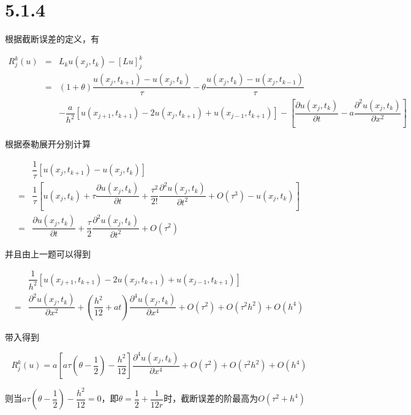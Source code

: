 \documentclass[9pt, a4paper]{article}
\begin{document}
\section*{5.1.4}
根据截断误差的定义，有
\begin{spacing}{2.3}
	\begin{equation}
	\begin{array}{rcl}
	R_j^k(u) & = & L_ku(x_j,t_k)-[Lu]_j^k\\
	& = & (1+\theta)\dfrac{u(x_j,t_{k+1})-u(x_j,t_k)}{\tau}-\theta \dfrac{u(x_j,t_k)-u(x_j,t_{k-1})}{\tau}\\
	&   & - \dfrac{a}{h^2}\left[u(x_{j+1},t_{k+1})-2u(x_j,t_{k+1})+u(x_{j-1},t_{k+1})\right]- \left[\dfrac{\partial u(x_j,t_k)}{\partial t}-a\dfrac{\partial^2 u(x_j,t_k)}{\partial x^2}\right]
	\end{array}
	\end{equation}
\end{spacing}
根据泰勒展开分别计算
\begin{spacing}{2.3}
	\begin{equation}
	\begin{array}{cl}
		& \dfrac{1}{\tau}[u(x_j,t_{k+1})-u(x_j,t_k)] \\
	  = & \dfrac{1}{\tau}[u(x_j,t_k)+\tau\dfrac{\partial u(x_j,t_k)}{\partial t}+\dfrac{\tau^2}{2!}\dfrac{\partial^2u(x_j,t_k)}{\partial t^2}+O(\tau^3)-u(x_j,t_k)]\\
	  = & \dfrac{\partial u(x_j,t_k)}{\partial t}+\dfrac{\tau}{2}\dfrac{\partial^2u(x_j,t_k)}{\partial t^2}+O(\tau^2)
	\end{array}
	\end{equation}
\end{spacing}
并且由上一题可以得到
\begin{spacing}{2.3}
	\begin{equation}
	\begin{array}{cl}
		 & \dfrac{1}{h^2}[u(x_{j+1},t_{k+1})-2u(x_j,t_{k+1})+u(x_{j-1},t_{k+1})]\\
		=& \dfrac{\partial^2u(x_j,t_k)}{\partial x^2}+\left(\dfrac{h^2}{12}+at\right)\dfrac{\partial^4u(x_j,t_k)}{\partial x^4}+O(\tau^2)+O(\tau^2h^2)+O(h^4)
	\end{array}
	\end{equation}
\end{spacing}
带入得到
\begin{spacing}{2.3}
	\begin{equation}
	R_j^k(u)=a[a\tau(\theta-\dfrac{1}{2})-\dfrac{h^2}{12}]\dfrac{\partial^4u(x_j,t_k)}{\partial x^4}+O(\tau^2)+O(\tau^2h^2)+O(h^4)
	\end{equation}
\end{spacing}

则当$a\tau(\theta-\dfrac{1}{2})-\dfrac{h^2}{12}=0$，即$\theta=\dfrac{1}{2}+\dfrac{1}{12r}$时，截断误差的阶最高为$O(\tau^2+h^4)$
\end{document}
